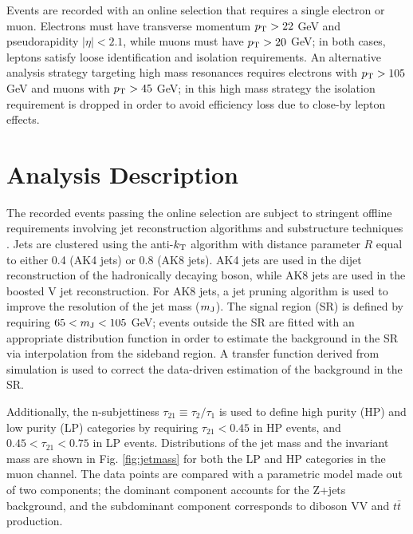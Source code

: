 \documentclass{PoS}
\begin{document}
Events are recorded with an online selection that requires a single electron or muon. Electrons must have transverse momentum $p_{\rm T}>22$ GeV and pseudorapidity $|\eta|<2.1$, while muons must have $p_{\rm T}>20$ GeV; in both cases, leptons satisfy loose identification and isolation requirements. An alternative analysis strategy targeting high mass resonances requires electrons with $p_{\rm T}>105$ GeV and muons with $p_{\rm T}>45$ GeV; in this high mass strategy the isolation requirement is dropped in order to avoid efficiency loss due to close-by lepton effects. 

\section{Analysis Description}
The recorded events passing the online selection are subject to stringent offline requirements involving jet reconstruction algorithms and substructure techniques \cite{Ellis:2009su}. Jets are clustered using the anti-$k_{\rm T}$ algorithm with distance parameter $R$ equal to either 0.4 (AK4 jets) or 0.8 (AK8 jets). AK4 jets are used in the dijet reconstruction of the hadronically decaying boson, while AK8 jets are used in the boosted V jet reconstruction. For AK8 jets, a jet pruning algorithm is used to improve the resolution of the jet mass ($m_{\rm J}$). The signal region (SR) is defined by requiring $65 < m_{\rm J} < 105$ GeV; events outside the SR are fitted with an appropriate distribution function in order to estimate the background in the SR via interpolation from the sideband region. A transfer function derived from simulation is used to correct the data-driven estimation of the background in the SR. 

Additionally, the n-subjettiness $\tau_{21}\equiv \tau_2/\tau_1$ \cite{Thaler:2011gf} is used to define high purity (HP) and low purity (LP) categories by requiring $\tau_{21}<0.45$ in HP events, and  $0.45 < \tau_{21}<0.75$ in LP events. Distributions of the jet mass and the invariant mass are shown in Fig. \ref{fig:jetmass} for both the LP and HP categories in the muon channel. The data points are compared with a parametric model made out of two components; the dominant component accounts for the Z+jets background, and the subdominant component corresponds to diboson VV and $t\bar{t}$ production.
\end{document}
